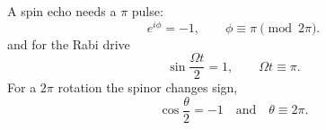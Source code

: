 \documentclass{article}
\begin{document}
A spin echo needs a $\pi$ pulse:
\begin{equation}
e^{i\phi} = -1, \qquad \phi \equiv \pi \pmod{2\pi} .
\label{eq:pi1}
\end{equation}
and for the Rabi drive
\begin{equation}
\sin\frac{\Omega t}{2} = 1, \qquad \Omega t \equiv \pi .
\label{eq:pi2}
\end{equation}
For a $2\pi$ rotation the spinor changes sign,
\begin{equation}
\cos\frac{\theta}{2} = -1 \quad \text{and} \quad \theta \equiv 2\pi .
\label{eq:pi3}
\end{equation}
\end{document}
